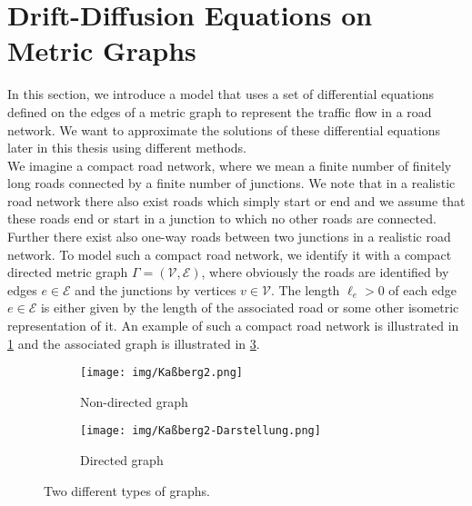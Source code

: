 \section{Drift-Diffusion Equations on Metric Graphs}
\label{ch1:sec2}

In this section, we introduce a model that uses a set of differential equations defined on the edges of a metric graph to represent the traffic flow in a road network. We want to approximate the solutions of these differential equations later in this thesis using different methods.  \\
We imagine a compact road network, where we mean a finite number of finitely long roads connected by a finite number of junctions. We note that in a realistic road network there also exist roads which simply start or end and we assume that these roads end or start in a junction to which no other roads are connected. Further there exist also one-way roads between two junctions in a realistic road network. To model such a compact road network, we identify it with a compact directed metric graph $\Gamma = (\mathcal{V}, \mathcal{E})$, where obviously the roads are identified by edges $e \in \mathcal{E}$ and the junctions by vertices $v \in \mathcal{V}$. The length $\ell_e > 0$ of each edge $e \in \mathcal{E}$ is either given by the length of the associated road or some other isometric representation of it. An example of such a compact road network is illustrated in \cref{fig8:f1} and the associated graph is illustrated in \cref{fig8:f2}. \\

\begin{figure}[H]
    \begin{center}
        \begin{subfigure}[b]{0.4\textwidth}
            \begin{center}
                \texttt{[image: img/Kaßberg2.png]}
            \end{center}
            \caption{Non-directed graph}
            \label{fig8:f1}
        \end{subfigure}
        \begin{subfigure}[b]{0.4\textwidth}
            \begin{center}
                \texttt{[image: img/Kaßberg2-Darstellung.png]}
            \end{center}
            \caption{Directed graph}
            \label{fig8:f2}
        \end{subfigure}
    \end{center}
    \caption{Two different types of graphs.}
\end{figure}


